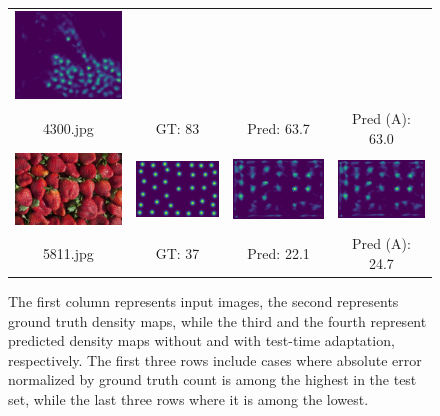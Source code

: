 \begin{figure}[htb]
\begin{tabular}{cccc}
		\includegraphics[width=0.24\linewidth]{fig/4300_pred_adapt.png} \\
		4300.jpg & GT: 83 & Pred: 63.7 & Pred (A): 63.0 \\
		\includegraphics[width=0.24\linewidth]{fig/5811_img.png} &
		\includegraphics[width=0.24\linewidth]{fig/5811_gt.png} &
		\includegraphics[width=0.24\linewidth]{fig/5811_pred.png} &
		\includegraphics[width=0.24\linewidth]{fig/5811_pred_adapt.png} \\
		5811.jpg & GT: 37 & Pred: 22.1 & Pred (A): 24.7 \\
	\end{tabular}
	\caption{The first column represents input images, the second represents ground truth density maps, while the third and the fourth represent predicted density maps without and with test-time adaptation, respectively. The first three rows include cases where absolute error normalized by ground truth count is among the highest in the test set, while the last three rows where it is among the lowest.}
	\label{fig:examples}
\end{figure}

